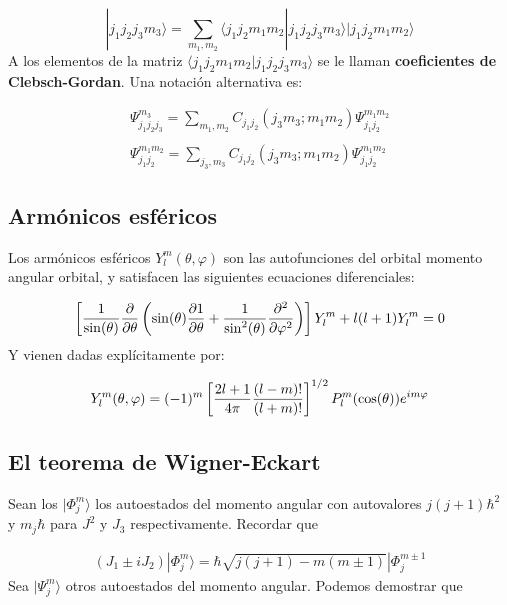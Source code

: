 \begin{equation}
   |j_1 j_2 j_3 m_3 \rangle  = \sum_{m_1, m_2}  \langle j_1 j_2 m_1 m_2 | j_1 j_2 j_3 m_3 \rangle    |j_1 j_2 m_1 m_2\rangle
\end{equation}
A los elementos de la matriz $\langle j_1 j_2 m_1 m_2 | j_1 j_2 j_3 m_3 \rangle$ se le llaman \textbf{coeficientes de Clebsch-Gordan}. Una notación alternativa es:

\begin{equation}
    \begin{array}{c}
    \Psi^{m_3}_{j_1j_2j_3} = \sum_{m_1,m_2} C_{j_1j_2} (j_3 m_3; m_1 m_2) \Psi^{m_1 m_2}_{j_1 j_2} \\ \\
    \Psi^{m_1 m_2}_{j_1j_2} = \sum_{j_3,m_3} C_{j_1j_2} (j_3 m_3; m_1 m_2) \Psi^{m_1 m_2}_{j_1 j_2} 
    \end{array}
\end{equation}

\subsection{Armónicos esféricos}

Los armónicos esféricos $Y_l^m (\theta, \varphi)$ son las autofunciones del orbital momento angular orbital, y satisfacen las siguientes ecuaciones diferenciales:

\begin{equation}
    \left[ \frac{1}{\sin (\theta)} \frac{\partial }{\partial \theta} \left( \sin (\theta) \frac{\partial 1}{\partial \theta} + \frac{1}{\sin^2 (\theta)} \frac{\partial ^2}{\partial \varphi^2} \right) \right] Y_l^m + l(l+1) Y_l^m = 0
\end{equation}
Y vienen dadas explícitamente por:

\begin{equation}
    Y_l^m (\theta,\varphi) = (-1)^m \left[ \frac{2l+1}{4 \pi} \frac{(l-m)!}{(l+m)!} \right]^{1/2} P_l^m (\cos (\theta)) e^{im\varphi}
\end{equation}

\subsection{El teorema de Wigner-Eckart}

Sean los $|\Phi_j^m\rangle$ los autoestados del momento angular con autovalores $j(j+1 )\hbar^2$ y $m_j \hbar$ para $J^2$ y $J_3$ respectivamente. Recordar que

\begin{eqnarray}
    (J_1\pm iJ_2) |\Phi_j^m \rangle = \hbar \sqrt{j(j+1)-m(m\pm 1)} |\Phi_j^{m\pm 1}
\end{eqnarray}
Sea $|\Psi_j^m\rangle$ otros autoestados del momento angular. Podemos demostrar que

